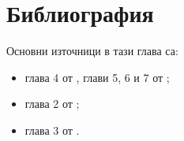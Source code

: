 \section*{Библиография}

Основни източници в тази глава са:
\begin{itemize}
\item 
  глава 4 от \cite{hopcroft1}, глави 5, 6 и 7 от \cite{hopcroft2};
\item
  глава 2 от \cite{sipser1};
\item
  глава 3 от \cite{papadimitriou}.
\end{itemize}



